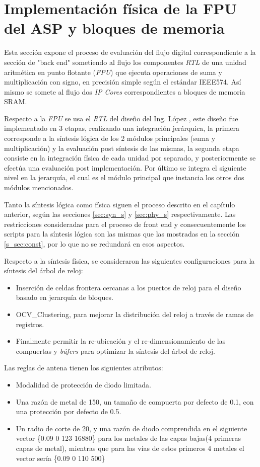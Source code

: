 \chapter{Implementación física de la FPU del ASP y bloques de memoria}

Esta sección expone el proceso de evaluación del flujo digital correspondiente a la sección de "back end" sometiendo al flujo los componentes \textit{RTL} de una unidad aritmética en punto flotante (\textit{FPU}) que ejecuta operaciones de suma y multiplicación con signo, en precisión simple según el estándar IEEE574. Así mismo se somete al flujo dos \textit{IP Cores} correspondientes a bloques de memoria SRAM.

Respecto a la \textit{FPU} se usa el \textit{RTL} del diseño del Ing. López \cite{Francis2016}, este diseño fue implementado en 3 etapas, realizando una integración jerárquica, la primera corresponde a la síntesis lógica de los 2 módulos principales (suma y multiplicación) y la evaluación post síntesis de las mismas, la segunda etapa consiste en la integración física de cada unidad por separado, y posteriormente se efectúa una evaluación post implementación. Por último se integra el siguiente nivel en la jerarquía, el cual es el módulo principal que instancia los otros dos módulos mencionados.

Tanto la síntesis lógica como física siguen el proceso descrito en el capítulo anterior, según las secciones \ref{sec:syn_s} y \ref{sec:phy_s} respectivamente. Las restricciones consideradas para el proceso de front end y consecuentemente los scripts para la síntesis lógica son las mismas que las mostradas en la sección \ref{s_sec:const}, por lo que no se redundará en esos aspectos.

Respecto a la síntesis física, se consideraron las siguientes configuraciones para la síntesis del árbol de reloj:

\begin{itemize}
\item Inserción de celdas frontera cercanas a los puertos de reloj para el diseño basado en jerarquía de bloques.
\item OCV\_Clustering, para mejorar la distribución del reloj a través de ramas de registros. 
\item Finalmente permitir la re-ubicación y el re-dimensionamiento de las compuertas y \textit{búfers} para optimizar la síntesis del árbol de reloj.
\end{itemize}

Las reglas de antena tienen los siguientes atributos:
\begin{itemize}
\item Modalidad de protección de diodo limitada.
\item Una razón de metal de 150, un tamaño de compuerta por defecto de 0.1, con una protección por defecto de 0.5.
\item Un radio de corte de 20, y una razón de diodo comprendida en el siguiente vector \{0.09 0 123 16880\} para los metales de las capas bajas(4 primeras capas de metal), mientras que para las vías de estos primeros 4 metales el vector sería \{0.09 0 110 500\}
\end{itemize}

